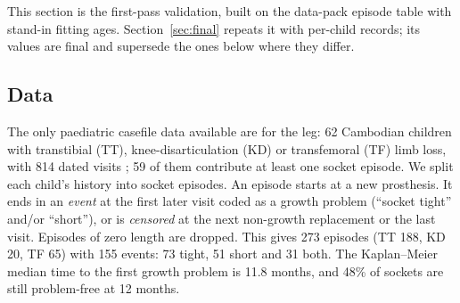 \documentclass[11pt]{article}
\theoremstyle{definition}
\begin{document}
This section is the first-pass validation, built on the data-pack episode table with stand-in fitting ages. Section~\ref{sec:final} repeats it with per-child records; its values are final and supersede the ones below where they differ.

\subsection{Data}
The only paediatric casefile data available are for the leg: 62 Cambodian children with transtibial (TT), knee-disarticulation (KD) or transfemoral (TF) limb loss, with 814 dated visits \cite{ghidiniData}; 59 of them contribute at least one socket episode. We split each child's history into socket episodes. An episode starts at a new prosthesis. It ends in an \emph{event} at the first later visit coded as a growth problem (``socket tight'' and/or ``short''), or is \emph{censored} at the next non-growth replacement or the last visit. Episodes of zero length are dropped. This gives 273 episodes (TT 188, KD 20, TF 65) with 155 events: 73 tight, 51 short and 31 both. The Kaplan--Meier median time to the first growth problem is 11.8 months, and 48\% of sockets are still problem-free at 12 months.
\end{document}
